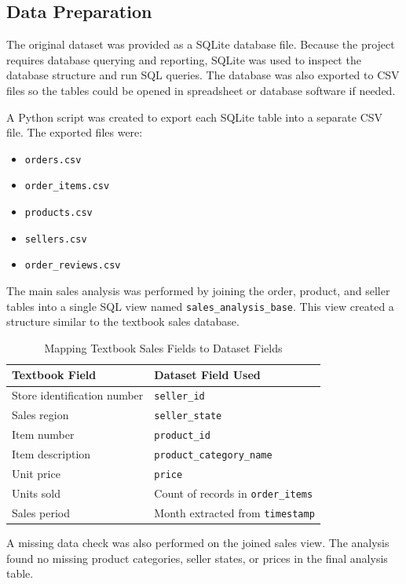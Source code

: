 \documentclass[12pt]{article}
\begin{document}
\subsection{Data Preparation}

The original dataset was provided as a SQLite database file. Because the project
requires database querying and reporting, SQLite was used to inspect the database
structure and run SQL queries. The database was also exported to CSV files so the
tables could be opened in spreadsheet or database software if needed.

A Python script was created to export each SQLite table into a separate CSV file.
The exported files were:

\begin{itemize}
    \item \texttt{orders.csv}
    \item \texttt{order\_items.csv}
    \item \texttt{products.csv}
    \item \texttt{sellers.csv}
    \item \texttt{order\_reviews.csv}
\end{itemize}

The main sales analysis was performed by joining the order, product, and seller
tables into a single SQL view named \texttt{sales\_analysis\_base}. This view
created a structure similar to the textbook sales database.

\begin{table}[H]
\centering
\begin{tabular}{ll}
\toprule
Textbook Field & Dataset Field Used \\
\midrule
Store identification number & \texttt{seller\_id} \\
Sales region & \texttt{seller\_state} \\
Item number & \texttt{product\_id} \\
Item description & \texttt{product\_category\_name} \\
Unit price & \texttt{price} \\
Units sold & Count of records in \texttt{order\_items} \\
Sales period & Month extracted from \texttt{timestamp} \\
\bottomrule
\end{tabular}
\caption{Mapping Textbook Sales Fields to Dataset Fields}
\end{table}

A missing data check was also performed on the joined sales view. The analysis
found no missing product categories, seller states, or prices in the final
analysis table.
\end{document}
